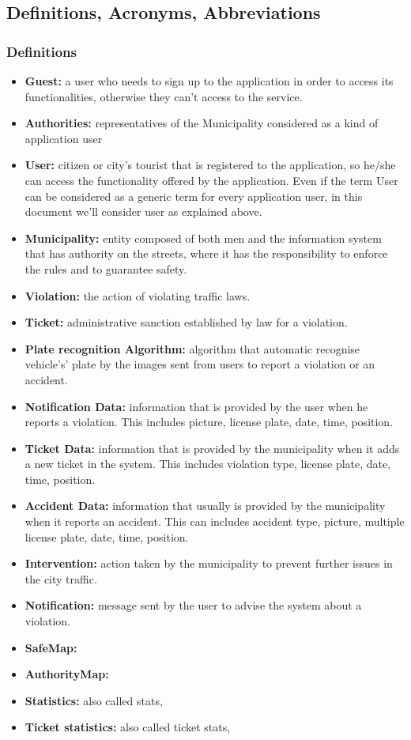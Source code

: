 \documentclass {article}
\begin{document}
	\subsection{Definitions, Acronyms, Abbreviations}
					
		\subsubsection{Definitions}
			
			\begin{itemize}
				\item {\bf Guest:} a user who needs to sign up to the application in order to access its functionalities, otherwise they can't access to the service.
				\item {\bf Authorities:} representatives of the Municipality considered as a kind of application user
				\item {\bf User:} citizen or city's tourist that is registered to the application, so he/she can access the functionality offered by the application. Even if the term User can be considered as a generic term for every application user, in this document we'll consider user as explained above.
				\item {\bf Municipality:} entity composed of both men and the information system that has authority on the streets, where it has the responsibility to enforce the rules and to guarantee safety. 
				\item {\bf Violation:} the action of violating traffic laws.
				\item {\bf Ticket:} administrative sanction established 	by law for a violation.
				\item {\bf Plate recognition Algorithm:} algorithm that 	automatic recognise vehicle's' plate by the images sent from users to report a violation or an accident.
				\item {\bf Notification Data:} information that is provided by the user when he reports a violation. This includes picture, license plate, date, time, position.
				\item {\bf Ticket Data:} information that is provided by the municipality when it adds a new ticket in the system. This includes violation type, license plate, date, time, position.
				\item {\bf Accident Data:} information that usually is 	provided by the municipality when it reports an accident. This can includes accident type, picture, multiple license plate, date, time, position.
				\item {\bf Intervention:} action taken by the municipality to prevent further issues in the city traffic.
				\item {\bf Notification:} message sent by the user to 						advise the system about a violation.
				\item {\bf SafeMap:}
				\item {\bf AuthorityMap:}
				\item {\bf Statistics:} also called stats, 
				\item {\bf Ticket statistics:} also called ticket stats,
			\end{itemize}
		
\end{document}
